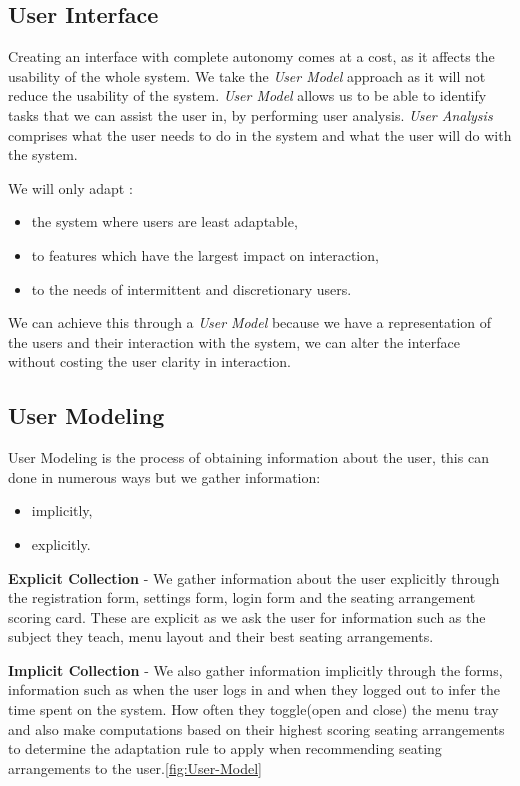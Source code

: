 \subsection{User Interface}
Creating an interface with complete autonomy comes at a cost, as it affects the usability of the whole system.  We take the \emph{User Model} approach as it will not reduce the usability of the system. \emph{User Model} allows us to be able to identify tasks that we can assist the user in, by performing user analysis. \emph{User Analysis} comprises what the user needs to do in the system and what the user will do with the system.

We will only adapt :
\begin{itemize}
    \item the system where users are least adaptable,
    \item to features which have the largest impact on interaction,
    \item to the needs of intermittent and discretionary users. \cite{benyon1993adaptive} 
\end{itemize}

We can achieve this through a \emph{User Model} because we have a representation of the users and their interaction with the system, we can alter the interface without costing the user clarity in interaction.


\subsection{User Modeling}
User Modeling is the process of obtaining information about the user, this can done in numerous ways but we gather information:
\begin{itemize}
    \item  implicitly,
    \item  explicitly.
\end{itemize}

\textbf{Explicit Collection} - We gather information about the user explicitly through the registration form, settings form, login form and the seating arrangement scoring card. These are explicit as we ask the user for information such as the subject they teach, menu layout and their best seating arrangements.

\textbf{Implicit Collection} - We also gather information implicitly through the forms, information such as when the user logs in and when they logged out to infer the time spent on the system. How often they toggle(open and close) the menu tray and also make computations based on their highest scoring seating arrangements to determine the adaptation rule to apply when recommending seating arrangements to the user.\ref{fig:User-Model}

